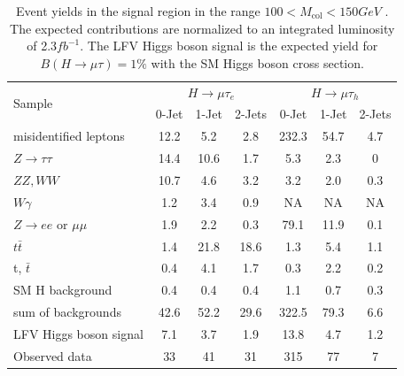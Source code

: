 \documentclass[oneside, letterpaper, oldfontcommands]{memoir}
\begin{document}
 \begin{table}[hbtp]
 \centering  \caption{Event yields in the signal region in the range $100 < M_\text{col} < 150GeV$ . The expected contributions are normalized to an integrated luminosity
of 2.3$fb^{-1}$. The LFV Higgs boson signal is the expected yield for $B(H \rightarrow \mu \tau)=1\%$ with the SM Higgs boson cross section.}
  \label{tab:EventYieldTable_100_to_150_13TeV}
  \begin{tabular}{lccc|ccc} \hline
        \multirow{2}{*}{Sample}                                & \multicolumn{3}{c}{$H \rightarrow \mu \tau_{e}$}                &     \multicolumn{3}{c}{$H \rightarrow \mu \tau_{h}$}     \\ \cline{2-7}
                                              &  0-Jet            & 1-Jet            & 2-Jets               &  0-Jet             & 1-Jet            & 2-Jets  \\ \hline
    misidentified leptons                    &  12.2  &   5.2     &  2.8 & 232.3 & 54.7 & 4.7 \\
    $ Z \rightarrow \tau \tau$                    & 14.4   & 10.6      &  1.7 & 5.3   & 2.3  & 0  \\
    $ ZZ,WW$                       & 10.7   &  4.6      &  3.2 & 3.2   & 2.0  & 0.3\\
    $ W\gamma$                             &   1.2  &  3.4      &  0.9 &NA & NA & NA    \\
    $ Z \rightarrow ee$ or $\mu \mu$          &  1.9   &  2.2      &  0.3 & 79.1 & 11.9& 0.1  \\
    $t\bar{t}     $                            &  1.4   & 21.8      & 18.6 &1.3 & 5.4 & 1.1    \\
    t, $\bar{t}$                             &  0.4   &  4.1      &  1.7 &0.3 & 2.2 & 0.2    \\
    SM H background                        &  0.4   &  0.4      &  0.4 &1.1 & 0.7 & 0.3    \\ \hline
    sum of backgrounds                       & 42.6   & 52.2      & 29.6 &322.5& 79.3 & 6.6  \\  \hline
    LFV Higgs boson signal                   &  7.1   &  3.7      &  1.9 &13.8 & 4.7 & 1.2    \\ \hline \hline
      Observed data                          &  33    &  41       &  31  & 315 & 77 & 7 \\ \hline
  \end{tabular}
\end{table}
\end{document}
